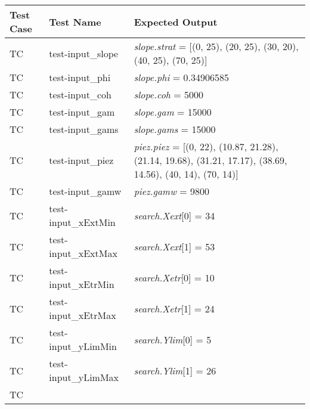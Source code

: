 \documentclass[12pt, titlepage]{article}
\newcounter{utestnum} %
\begin{document}
\begin{longtable}{  l  p{4cm}  p{6cm}  }
	\hline
	\textbf{Test Case} & \textbf{Test Name} & \textbf{Expected Output} \\
	\hline
	TC{utestnum}\theutestnum  \label{TC_InputSlope} & 
	test-input\_slope &  \textit{slope.strat} = [(0, 25), (20, 25), (30, 20), 
	(40, 25), (70, 25)]\\
	\hline 
	TC{utestnum}\theutestnum  \label{TC_InputPhi} & 
	test-input\_phi &  \textit{slope.phi} = 0.34906585\\ 
	\hline
	TC{utestnum}\theutestnum  \label{TC_InputCoh} & 
	test-input\_coh &  \textit{slope.coh} = 5000\\ 
	\hline
	TC{utestnum}\theutestnum  \label{TC_InputGam} & 
	test-input\_gam &  \textit{slope.gam} = 15000\\ 
	\hline
	TC{utestnum}\theutestnum  \label{TC_InputGams} & 
	test-input\_gams &  \textit{slope.gams} = 15000\\ 
	\hline
	TC{utestnum}\theutestnum  \label{TC_InputWT} & 
	test-input\_piez &  \textit{piez.piez} = [(0, 22), 
	(10.87, 21.28), (21.14, 19.68), (31.21, 17.17), (38.69, 14.56), (40, 
	14), (70, 14)]\\
	\hline 
	TC{utestnum}\theutestnum  \label{TC_InputGamw} & 
	test-input\_gamw &  \textit{piez.gamw} = 9800\\ 
	\hline
	TC{utestnum}\theutestnum  \label{TC_InputXextMin} & 
	test-input\_xExtMin &  \textit{search.Xext}[0] = 34\\ 
	\hline
	TC{utestnum}\theutestnum  \label{TC_InputXextMax} & 
	test-input\_xExtMax &  \textit{search.Xext}[1] = 53\\ 
	\hline
	TC{utestnum}\theutestnum  \label{TC_InputXetrMin} & 
	test-input\_xEtrMin &  \textit{search.Xetr}[0] = 10\\ 
	\hline
	TC{utestnum}\theutestnum  \label{TC_InputXetrMax} & 
	test-input\_xEtrMax &  \textit{search.Xetr}[1] = 24\\ 
	\hline
	TC{utestnum}\theutestnum  \label{TC_InputYlimMin} & 
	test-input\_yLimMin &  \textit{search.Ylim}[0] = 5\\ 
	\hline
	TC{utestnum}\theutestnum  \label{TC_InputYlimMax} & 
	test-input\_yLimMax &  \textit{search.Ylim}[1] = 26\\ 
	\hline
	TC{utestnum}\theutestnum  \label{TC_InputLtoR} & 

\end{longtable}
\end{document}
